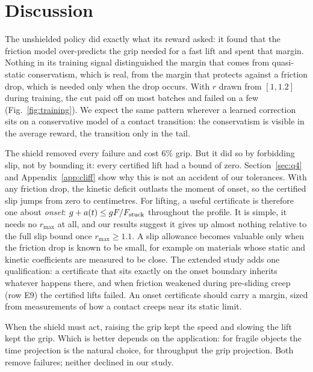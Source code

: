 \section{Discussion}\label{sec:discussion}
 The unshielded policy did
exactly what its reward asked: it found that the friction model over-predicts the grip needed for a fast lift and spent
that margin. Nothing in its training signal distinguished the margin that comes from quasi-static conservatism, which is
real, from the margin that protects against a friction drop, which is needed only when the drop occurs. With $r$ drawn from
$[1,1.2]$ during training, the cut paid off on most batches and failed on a few (Fig.~\ref{fig:training}). We expect the
same pattern wherever a learned correction sits on a conservative model of a contact transition: the conservatism is
visible in the average reward, the transition only in the tail.

 The shield removed every failure and cost 6\% grip. But it did so by forbidding slip,
not by bounding it: every certified lift had a bound of zero. Section~\ref{sec:q4} and Appendix~\ref{app:cliff} show why
this is not an accident of our tolerances. With any friction drop, the kinetic deficit outlasts the moment of onset, so
the certified slip jumps from zero to centimetres. For lifting, a useful certificate is therefore one about \emph{onset}:
$g+a(t)\le gF/F_{\mathrm{stuck}}$ throughout the profile. It is simple, it needs no $r_{\max}$ at all, and our results suggest it gives up
almost nothing relative to the full slip bound once $r_{\max}\ge1.1$. A slip allowance becomes valuable only when the
friction drop is known to be small, for example on materials whose static and kinetic coefficients are measured to be
close. The extended study adds one qualification: a certificate that sits exactly on the onset boundary inherits whatever
happens there, and when friction weakened during pre-sliding creep (row E9) the certified lifts failed. An onset
certificate should carry a margin, sized from measurements of how a contact creeps near its static limit.

 When the shield must act, raising the grip kept the speed and slowing the lift kept the grip. Which
is better depends on the application: for fragile objects the time projection is the natural choice, for throughput the
grip projection. Both remove failures; neither declined in our study.

